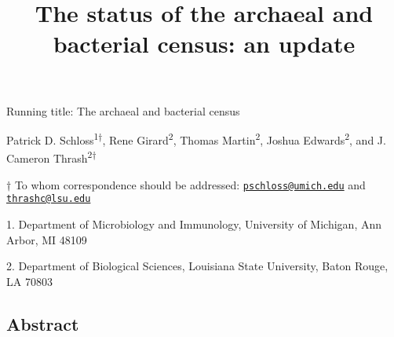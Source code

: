 \documentclass[11pt,]{article}
\title{\textbf{The status of the archaeal and bacterial census: an update}}
\author{}
\date{}
\begin{document}
\maketitle

\vspace{35mm}

Running title: The archaeal and bacterial census

\vspace{35mm}

Patrick D. Schloss\textsuperscript{1\(\dagger\)}, Rene
Girard\textsuperscript{2}, Thomas Martin\textsuperscript{2}, Joshua
Edwards\textsuperscript{2}, and J. Cameron
Thrash\textsuperscript{2\(\dagger\)}

\vspace{40mm}

\(\dagger\) To whom correspondence should be addressed:
\href{mailto:pschloss@umich.edu}{\nolinkurl{pschloss@umich.edu}} and
\href{mailto:thrashc@lsu.edu}{\nolinkurl{thrashc@lsu.edu}}

1. Department of Microbiology and Immunology, University of Michigan,
Ann Arbor, MI 48109

2. Department of Biological Sciences, Louisiana State University, Baton
Rouge, LA 70803

\newpage

\linenumbers

\subsection{Abstract}\label{abstract}
\end{document}
